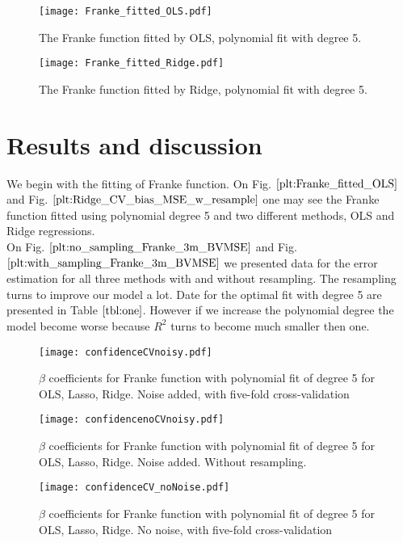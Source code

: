 \documentclass[10pt]{article}
\begin{document}
\begin{figure}
	\centerline{\texttt{[image: Franke\_fitted\_OLS.pdf]}}
	\caption{The  Franke function fitted by OLS, polynomial fit with degree 5.} \label{plt:Franke_fitted_OLS}
\end{figure}

\begin{figure}
	\centerline{\texttt{[image: Franke\_fitted\_Ridge.pdf]}}
	\caption{The  Franke function fitted by Ridge, polynomial fit with degree 5.} \label{plt:Franke_fitted_Ridge}
\end{figure}



\section{Results and discussion} \label{Results}
We begin with the fitting of Franke function. On Fig. $\ref{plt:Franke_fitted_OLS}$ and Fig. $\ref{plt:Ridge_CV_bias_MSE_w_resample}$ one may see the Franke function fitted using polynomial degree 5 and two different methods, OLS and Ridge regressions.   \\
On Fig. $\ref{plt:no_sampling_Franke_3m_BVMSE}$ and Fig. $\ref{plt:with_sampling_Franke_3m_BVMSE}$ we presented data for the error estimation for all three methods with and without resampling. The resampling turns to improve our model a lot. Date for the optimal fit with degree 5 are presented in Table $\ref{tbl:one}$. However if we increase the polynomial degree the model become worse because $R^2$ turns to become much smaller then one.


\begin{figure}
	\centerline{\texttt{[image: confidenceCVnoisy.pdf]}}
	\label{plt:BetaNoiseCV}
	\caption{$\beta$ coefficients for Franke function with polynomial fit of degree 5 for OLS, Lasso, Ridge. Noise added, with five-fold cross-validation}
\end{figure}

\begin{figure}
	\centerline{\texttt{[image: confidencenoCVnoisy.pdf]}}
	\label{plt:BetaNoiseNoCV}
	\caption{$\beta$ coefficients for Franke function with polynomial fit of degree 5 for OLS, Lasso, Ridge. Noise added. Without resampling.}
\end{figure}

\begin{figure}
	\centerline{\texttt{[image: confidenceCV\_noNoise.pdf]}}
	\label{plt:BetaNONoiseCV}
	\caption{$\beta$ coefficients for Franke function with polynomial fit of degree 5 for OLS, Lasso, Ridge. No noise, with five-fold cross-validation}
\end{figure}
\end{document}
